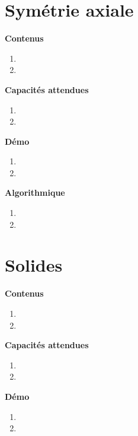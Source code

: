 \documentclass[10pt,a4paper]{article}
\begin{document}
\section{Symétrie axiale}

\textbf{Contenus}

\begin{enumerate} 
\item 
\item 
\end{enumerate}


\textbf{Capacités attendues}

\begin{enumerate}
\item 
\item 
\end{enumerate}

\textbf{Démo}

\begin{enumerate}
\item 
\item 
\end{enumerate}

\textbf{Algorithmique}

\begin{enumerate}
\item 
\item 
\end{enumerate}

\section{Solides}

\textbf{Contenus}

\begin{enumerate} 
\item 
\item 
\end{enumerate}


\textbf{Capacités attendues}

\begin{enumerate}
\item 
\item 
\end{enumerate}

\textbf{Démo}

\begin{enumerate}
\item 
\item 
\end{enumerate}
\end{document}
